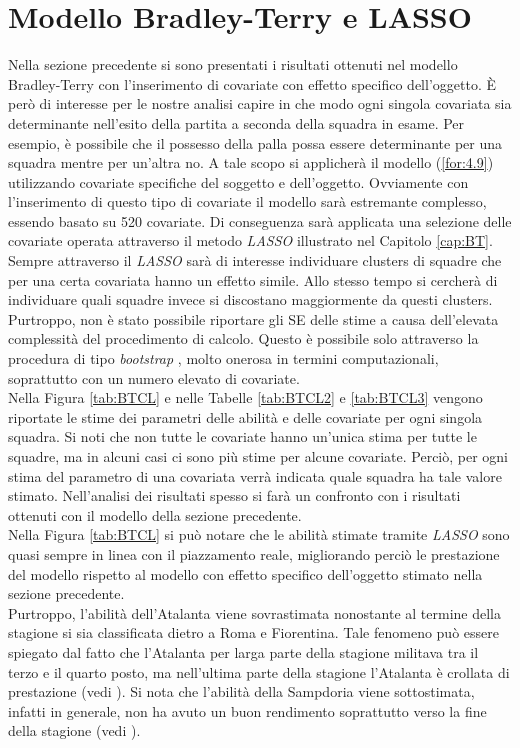 \section{Modello Bradley-Terry e LASSO}
Nella sezione precedente si sono presentati i risultati ottenuti nel modello Bradley-Terry con l'inserimento di covariate con effetto specifico dell'oggetto. È però di interesse per le nostre analisi capire in che modo ogni singola covariata sia determinante nell'esito della partita a seconda della squadra in esame. Per esempio, è possibile che il possesso della palla possa essere determinante per una squadra mentre per un'altra no. A tale scopo si applicherà il modello (\ref{for:4.9}) utilizzando covariate specifiche del soggetto e dell'oggetto. Ovviamente con l'inserimento di questo tipo di covariate il modello sarà estremante complesso, essendo basato su 520 covariate. Di conseguenza sarà applicata una selezione delle covariate operata attraverso il metodo \emph{LASSO} illustrato nel Capitolo \ref{cap:BT}. Sempre attraverso il \emph{LASSO} sarà di interesse individuare clusters di squadre che per una certa covariata hanno un effetto simile. Allo stesso tempo si cercherà di individuare quali squadre invece si discostano maggiormente da questi clusters.\\
Purtroppo, non è stato possibile riportare gli SE delle stime a causa dell'elevata complessità del procedimento di calcolo. Questo è possibile solo attraverso la procedura di tipo \emph{bootstrap} \autocite{henderson2005bootstrap}, molto onerosa in termini computazionali, soprattutto con un numero elevato di covariate.\\
Nella Figura \ref{tab:BTCL} e nelle Tabelle \ref{tab:BTCL2} e \ref{tab:BTCL3} vengono riportate le stime dei parametri delle abilità e delle covariate per ogni singola squadra. Si noti che non tutte le covariate hanno un’unica stima per tutte le squadre, ma in alcuni casi ci sono più stime per alcune covariate. Perciò, per ogni stima del parametro di una covariata verrà indicata quale squadra ha tale valore stimato. Nell'analisi dei risultati spesso si farà un confronto con i risultati ottenuti con il modello della sezione precedente.\\%
Nella Figura \ref{tab:BTCL} si può notare che le abilità stimate tramite \emph{LASSO} sono quasi sempre  in linea con il piazzamento reale, migliorando perciò le prestazione del modello rispetto al modello con effetto specifico dell'oggetto stimato nella sezione precedente.\\
Purtroppo, l'abilità dell'Atalanta viene sovrastimata nonostante al termine della stagione si sia classificata dietro a Roma e Fiorentina. Tale fenomeno può essere spiegato dal fatto che l'Atalanta per larga parte della stagione militava tra il terzo e il quarto posto, ma nell'ultima parte della stagione l'Atalanta è crollata di prestazione (vedi \textit{\cite{storyAta}}). Si nota che l'abilità della Sampdoria viene sottostimata, infatti in generale, non ha avuto un buon rendimento soprattutto verso la fine della stagione (vedi \textit{\cite{storySamp}}).\\

